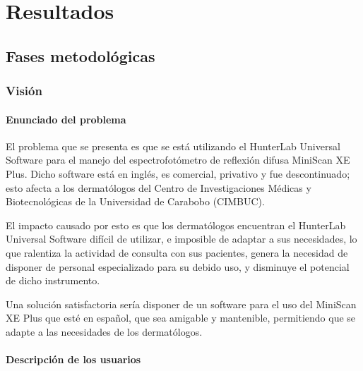 \chapter{Resultados}

\capIV

\section{Fases metodol\'{o}gicas}

\subsection{Visi\'{o}n}
	
	\subsubsection{Enunciado del problema}
	
	El problema que se presenta es que se est\'{a} utilizando el HunterLab Universal Software para el manejo del espectrofot\'{o}metro de reflexi\'{o}n difusa MiniScan XE Plus. Dicho software est\'{a} en ingl\'{e}s, es comercial, privativo y fue descontinuado; esto afecta a los dermat\'{o}logos del Centro de Investigaciones M\'{e}dicas y Biotecnol\'{o}gicas de la Universidad de Carabobo (CIMBUC).
	
	El impacto causado por esto es que los dermat\'{o}logos encuentran el HunterLab Universal Software dif\'{i}cil de utilizar, e imposible de adaptar a sus necesidades, lo que ralentiza la actividad de consulta con sus pacientes, genera la necesidad de disponer de personal especializado para su debido uso, y disminuye el potencial de dicho instrumento.
	
	Una soluci\'{o}n satisfactoria ser\'{i}a disponer de un software para el uso del \mbox{MiniScan} XE Plus que est\'{e} en espa\~{n}ol, que sea amigable y mantenible, permitiendo que se adapte a las necesidades de los dermat\'{o}logos.
	
	\subsubsection{Descripci\'{o}n de los usuarios}
	
